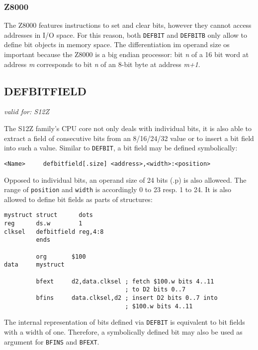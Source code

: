 \documentclass[12pt,twoside]{report}
\makeatletter
\newcommand{\tty}[1]{{\tt #1}}
\newcommand{\ttindex}[1]{\index{#1@{\tt #1}}}
\makeatother
\begin{document}
\subsubsection{Z8000}

The Z8000 features instructions to set and clear bits, however they cannot access
addresses in I/O space.  For this reason, both {\tt DEFBIT} and {\tt DEFBITB}
only allow to define bit objects in memory space.  The differentiation im operand
size os important because the Z8000 is a big endian processor: bit {\em n} of a
16 bit word at address {\em m} corresponds to bit {\em n} of an 8-bit byte at
address {\em m+1}.


\subsection{DEFBITFIELD}
\ttindex{DEFBITFIELD}

{\em valid for: S12Z}

The S12Z family's CPU core not only deals with individual bits, it
is also able to extract a field of consecutive bits from an
8/16/24/32 value or to insert a bit field into such a value. Similar
to \tty{DEFBIT}, a bit field may be defined symbolically:
\begin{verbatim}
<Name>     defbitfield[.size] <address>,<width>:<position>
\end{verbatim}
Opposed to individual bits, an operand size of 24 bits (.p) is also
alloweed.  The range of \tty{position} and \tty{width} is accordingly 
0 to 23 resp. 1 to 24.  It is also allowed to define bit fields as
parts of structures:
\begin{verbatim}
mystruct struct      dots
reg      ds.w        1
clksel   defbitfield reg,4:8
         ends

         org       $100
data     mystruct

         bfext     d2,data.clksel ; fetch $100.w bits 4..11
                                  ; to D2 bits 0..7
         bfins     data.clksel,d2 ; insert D2 bits 0..7 into
                                  ; $100.w bits 4..11
\end{verbatim}
The internal representation of bits defined via \tty{DEFBIT} is
equivalent to bit fields with a width of one.  Therefore, a
symbolically defined bit may also be used as argument for
\tty{BFINS} and \tty{BFEXT}.

\end{document}
